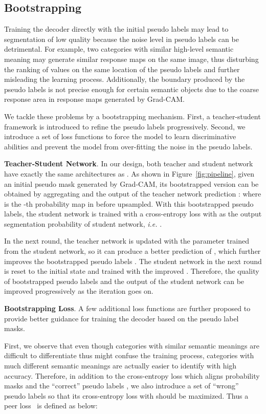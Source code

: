 \documentclass[runningheads]{llncs}
\def\ie{\emph{i.e. }}
\newcommand{\PAR}[1]{\smallskip \noindent \textbf{#1}}
\begin{document}
\subsection{Bootstrapping}
Training the decoder directly with the initial pseudo labels may lead to segmentation of low quality because the noise level in pseudo labels can be detrimental. For example, two categories with similar high-level semantic meaning may generate similar response maps on the same image, thus disturbing the ranking of  values on the same location of the pseudo labels and further misleading the learning process. Additionally, the boundary produced by the pseudo labels is not precise enough for certain semantic objects due to the coarse response area in response maps generated by Grad-CAM. 

We tackle these problems by a bootstrapping mechanism. First, a teacher-student framework is introduced to refine the pseudo labels progressively. Second, we introduce a set of loss functions to force the model to learn discriminative abilities and prevent the model from over-fitting the noise in the pseudo labels.

\PAR{Teacher-Student Network}. In our design, both teacher and student network have exactly the same architectures as . As shown in Figure~\ref{fig:pipeline}, given an initial pseudo mask  generated by Grad-CAM, its bootstrapped version  can be obtained by aggregating  and the output of the teacher network prediction :
where  is the -th probability map in  before upsampled. With this bootstrapped pseudo labels, the student network is trained with a cross-entropy loss  with  as the output segmentation probability of student network, \ie .

In the next round, the teacher network is updated with the parameter trained from the student network, so it can produce a better prediction of , which further improves the bootstrapped pseudo labels . The student network in the next round is reset to the initial state and trained with the improved . Therefore, the quality of bootstrapped pseudo labels and the output of the student network can be improved progressively as the iteration goes on. 

\PAR{Bootstrapping Loss}. A few additional loss functions are further proposed to provide better guidance for training the decoder based on the pseudo label masks. 

First, we observe that even though categories with similar semantic meanings are difficult to differentiate thus might confuse the training process, categories with much different semantic meanings are actually easier to identify with high accuracy. Therefore, in addition to the cross-entropy loss which aligns probability masks  and the ``correct'' pseudo labels , we also introduce a set of ``wrong'' pseudo labels  so that its cross-entropy loss with  should be maximized. Thus a peer loss~\cite{liu2020PeerLoss} is defined as below:
\end{document}
